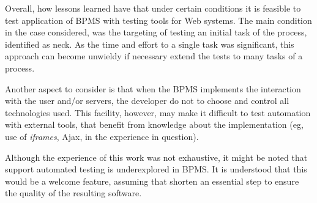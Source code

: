 \documentclass[runningheads,a4paper]{llncs}
\begin{document}
Overall, how lessons learned have that under certain conditions it is feasible to test application of BPMS with testing tools for Web systems. The main condition in the case considered, was the targeting of testing an initial task of the process, identified as neck. As the time and effort to a single task was significant, this approach can become unwieldy if necessary extend the tests to many tasks of a process.



Another aspect to consider is that when the BPMS implements the interaction with the user and/or servers, the developer do not to choose and control all technologies used. This facility, however, may make it difficult to test automation with external tools, that benefit from knowledge about the implementation (eg, use of \emph{iframes}, Ajax, in the experience in question).


Although the experience of this work was not exhaustive, it might be noted that support automated testing is underexplored in BPMS. It is understood that this would be a welcome feature, assuming that shorten an essential step to ensure the quality of the resulting software.
\end{document}
